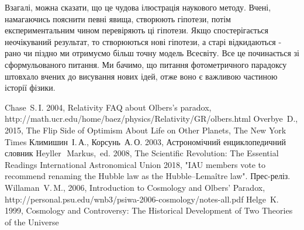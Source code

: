 \documentclass[a4paper]{article}
\begin{document}
Взагалі, можна сказати, що це чудова ілюстрація наукового методу. Вчені, намагаючись пояснити певні явища, створюють гіпотези, потім експериментальним чином перевіряють ці гіпотези. Якщо спостерігається неочікуваний результат, то створюються нові гіпотези, а старі відкидаються - рано чи піздно ми отримуємо більш точну модель Всесвіту. Все це починається зі сформульованого питання. Ми бачимо, що питання фотометричного парадоксу штовхало вчених до висування нових ідей, отже воно є важливою частиною історії фізики.

\begin{thebibliography}{9}
{\small
{} Chase~S.\,I. 2004, Relativity FAQ about Olbers's paradox, http://math.ucr.edu/home/baez/physics/Relativity/GR/olbers.html
 Overbye~D., 2015, The Flip Side of Optimism About Life on Other Planets, The New York Times
 Климишин~І.\,А., Корсунь~А.\,О. 2003, Астрономічний енциклопедичний словник
 Heyller\,~Markus,~ed. 2008, The Scientific Revolution: The Essential Readings
 International Astronomical Union 2018, "IAU members vote to recommend renaming the Hubble law as the Hubble–Lemaître law". Прес-реліз.
 Willaman~V.\,M., 2006, Introduction to Cosmology and Olbers' Paradox, http://personal.psu.edu/wnb3/psiwa-2006-cosmology/notes-all.pdf
 Helge~K. 1999, Cosmology and Controversy: The Historical Development of Two Theories of the Universe
}
\end{thebibliography}
\end{document}
